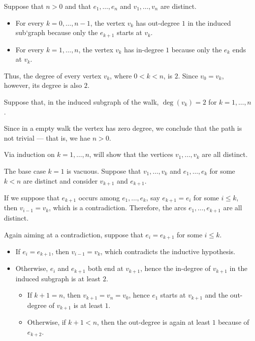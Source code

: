 \begin{defproof}
   Suppose that \( n > 0 \) and that \( e_1, \ldots, e_n \) and \( v_1, \ldots, v_n \) are distinct.

  \begin{itemize}
    \item For every \( k = 0, \ldots, n - 1 \), the vertex \( v_k \) has out-degree \( 1 \) in the induced sub`graph because only the \( e_{k+1} \) starts at \( v_k \).

    \item For every \( k = 1, \ldots, n \), the vertex \( v_k \) has in-degree \( 1 \) because only the \( e_k \) ends at \( v_k \).
  \end{itemize}

  Thus, the degree of every vertex \( v_k \), where \( 0 < k < n \), is \( 2 \). Since \( v_0 = v_k \), however, its degree is also \( 2 \).

   Suppose that, in the induced subgraph of the walk, \( \deg(v_k) = 2 \) for \( k = 1, \ldots, n \).

  Since in a empty walk the vertex has zero degree, we conclude that the path is not trivial --- that is, we hae \( n > 0 \).

   Via induction on \( k = 1, \ldots, n \), will show that the vertices \( v_1, \ldots, v_k \) are all distinct.

  The base case \( k = 1 \) is vacuous. Suppose that \( v_1, \ldots, v_k \) and \( e_1, \ldots, e_k \) for some \( k < n \) are distinct and consider \( v_{k+1} \) and \( e_{k+1} \).

  If we suppose that \( e_{k+1} \) occurs among \( e_1, \ldots, e_k \), say \( e_{k+1} = e_i \) for some \( i \leq k \), then \( v_{i - 1} = v_k \), which is a contradiction. Therefore, the arcs \( e_1, \ldots, e_{k+1} \) are all distinct.

  Again aiming at a contradiction, suppose that \( e_i = e_{k+1} \) for some \( i \leq k \).
  \begin{itemize}
    \item If \( e_i = e_{k+1} \), then \( v_{i-1} = v_k \), which contradicts the inductive hypothesis.
    \item Otherwise, \( e_i \) and \( e_{k+1} \) both end at \( v_{k+1} \), hence the in-degree of \( v_{k+1} \) in the induced subgraph is at least \( 2 \).
    \begin{itemize}
      \item If \( k + 1 = n \), then \( v_{k+1} = v_n = v_0 \), hence \( e_1 \) starts at \( v_{k+1} \) and the out-degree of \( v_{k+1} \) is at least \( 1 \).
      \item Otherwise, if \( k + 1 < n \), then the out-degree is again at least \( 1 \) because of \( e_{k+2} \).
    \end{itemize}


\end{itemize}
\end{defproof}

